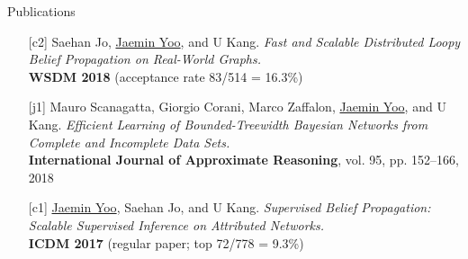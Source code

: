 \documentclass{resume} %
\begin{document}
\begin{rSection}{Publications}
\begin{enumerate}
	\item[{[c2]}] Saehan Jo, \underline{Jaemin Yoo}, and U Kang.
		\emph{Fast and Scalable Distributed Loopy Belief Propagation on Real-World Graphs.} \\
		\textbf{WSDM 2018} (acceptance rate 83/514 = 16.3\%)

	\item[{[j1]}] Mauro Scanagatta, Giorgio Corani, Marco Zaffalon, \underline{Jaemin Yoo}, and U Kang.
		\emph{Efficient Learning of Bounded-Treewidth Bayesian Networks from Complete and Incomplete Data Sets.} \\
		\textbf{International Journal of Approximate Reasoning}, vol. 95, pp. 152--166, 2018

	\item[{[c1]}] \underline{Jaemin Yoo}, Saehan Jo, and U Kang.
		\emph{Supervised Belief Propagation: Scalable Supervised Inference on Attributed Networks.} \\
		\textbf{ICDM 2017} (regular paper; top 72/778 = 9.3\%)

\end{enumerate}
\end{rSection}

\end{document}

